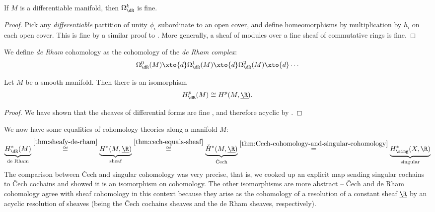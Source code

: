 \documentclass[11pt]{book}
\begin{document}
\begin{proposition}\label{prop:Omega-sheaves-are-fine} 
If $M$ is a differentiable manifold, then $\Omega^k_\dR$ is fine.
\end{proposition}
\begin{proof} Pick any \emph{differentiable} partition of unity $\phi_i$ subordinate to an open cover, and define homeomorphisms by multiplication by $h_i$ on each open cover. This is fine by a similar proof to . More generally, a sheaf of modules over a fine sheaf of commutative rings is fine.
\end{proof}

\begin{definition} We define \emph{de Rham} cohomology as the cohomology of the \emph{de Rham complex}:
\begin{align*}
    \Omega^0_\dR(M) \xto{d} \Omega^1_{\dR}(M) \xto{d} \Omega^2_\dR(M) \xto{d} \cdots
\end{align*}
\end{definition}

\begin{theorem}
\label{thm:sheafy-de-rham}
 Let $M$ be a smooth manifold. Then there is an isomorphism
\begin{align*}
    H^p_\dR(M) \cong H^p(M,\underline{\R}).
\end{align*}
\end{theorem}
\begin{proof}
We have shown that the sheaves of differential forms are fine , and therefore acyclic by .
\end{proof}

We now have some equalities of cohomology theories along a manifold $M$:
\begin{align*}
    \underbrace{H^\ast_\dR(M)}_{\text{de Rham}} \overset{\ref{thm:sheafy-de-rham}}{\cong} \underbrace{H^\ast(M,\underline{\R})}_{\text{sheaf}} \overset{\ref{thm:cech-equals-sheaf}}{\cong} \underbrace{\check{H}^\ast(M,\underline{\R})}_{\text{\v{C}ech}} \overset{\ref{thm:Cech-cohomology-and-singular-cohomology}}{=} \underbrace{H^\ast_\sing(X,\R)}_{\text{singular}}
\end{align*}
%
The comparison between \v{C}ech and singular cohomology was very precise, that is, we cooked up an explicit map sending singular cochains to \v{C}ech cochains and showed it is an isomorphism on cohomology. The other isomorphisms are more abstract -- \v{C}ech and de Rham cohomology agree with sheaf cohomology in this context because they arise as the cohomology of a resolution of a constant sheaf $\underline{\R}$ by an acyclic resolution of sheaves (being the \v{C}ech cochains sheaves and the de Rham sheaves, respectively).
\end{document}
